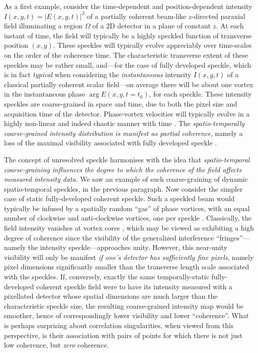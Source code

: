 \documentclass[%
 reprint,
 amsmath,amssymb,
 aps,
]{revtex4-1}
\begin{document}
As a first example, consider the time-dependent and position-dependent intensity $I(x,y,t)=|E(x,y,t)|^2$ of a partially coherent beam-like $z$-directed paraxial field illuminating a region $\Omega$ of a 2D detector in a plane of constant $z$.  At each instant of time, the field will typically be a highly speckled function of transverse position $(x,y)$.  These speckles will typically evolve appreciably over time-scales on the order of the coherence time.  The characteristic transverse extent of these speckles may be rather small, and---for the case of fully developed speckle, which is in fact {\em typical} when considering the {\em instantaneous} intensity $I(x,y,t)$ of a classical partially coherent scalar field---on average there will be about one vortex in the instantaneous phase $\arg  E(x,y,t=t_0)$, for each speckle.  These intensity speckles are coarse-grained in space and time, due to both the pixel size and acquisition time of the detector.  Phase-vortex velocities will typically evolve in a highly non-linear and indeed chaotic manner with time \cite{Alperin2019}. The {\em spatio-temporally coarse-grained intensity distribution is manifest as partial coherence}, namely a loss of the maximal visibility associated with fully developed speckle \cite{paganin_book}.  

The concept of unresolved speckle harmonises with the idea that {\em spatio-temporal coarse-graining influences the degree to which the coherence of the field affects measured intensity data.}  We saw an example of such coarse-graining of dynamic spatio-temporal speckles, in the previous paragraph.  Now consider the simpler case of static fully-developed coherent speckle. Such a speckled beam would typically be infused by a spatially random ``gas'' of phase vortices, with an equal number of clockwise and anti-clockwise vortices, one per speckle \cite{Goodman2007,paganin_book}.  Classically, the field intensity vanishes at vortex cores \cite{Dirac1931}, which may be viewed as  exhibiting a high degree of coherence since the visibility of the generalized interference ``fringes''---namely the intensity speckle---approaches unity.  However, this near-unity visibility will only be manifest {\em if one's detector has sufficiently fine pixels}, namely pixel dimensions significantly smaller than the transverse length scale associated with the speckles.  If, conversely, exactly the same temporally-static fully-developed coherent speckle field were to have its intensity measured with a pixellated detector whose spatial dimensions are much larger than the characteristic speckle size, the resulting coarse-grained intensity map would be smoother, hence of correspondingly lower visibility and lower ``coherence''.  What is perhaps surprising about correlation singularities, when viewed from this perspective, is their association with pairs of points for which there is not just low coherence, but {\em zero} coherence.     
\end{document}
